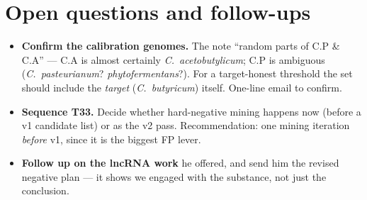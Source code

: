 \documentclass{article}
\begin{document}
\section{Open questions and follow-ups}
\begin{itemize}
\item \textbf{Confirm the calibration genomes.} The note ``random parts of C.P \& C.A'' --- C.A is almost certainly \emph{C.\ acetobutylicum}; C.P is ambiguous (\emph{C.\ pasteurianum}? \emph{phytofermentans}?). For a target-honest threshold the set should include the \emph{target} (\emph{C.\ butyricum}) itself. One-line email to confirm.
\item \textbf{Sequence T33.} Decide whether hard-negative mining happens now (before a v1 candidate list) or as the v2 pass. Recommendation: one mining iteration \emph{before} v1, since it is the biggest FP lever.
\item \textbf{Follow up on the lncRNA work} he offered, and send him the revised negative plan --- it shows we engaged with the substance, not just the conclusion.
\end{itemize}
\end{document}
